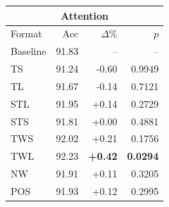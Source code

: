\begin{tabular}{lrrr}
\toprule
\multicolumn{4}{c}{\textbf{Attention }} \\
\midrule
Format & Acc & $\Delta$\% & $p$ \\
\midrule
Baseline & 91.83 & -- & -- \\
\midrule
TS & 91.24 & -0.60 & 0.9949 \\
TL & 91.67 & -0.14 & 0.7121 \\
STL & 91.95 & +0.14 & 0.2729 \\
STS & 91.81 & +0.00 & 0.4881 \\
TWS & 92.02 & +0.21 & 0.1756 \\
TWL & 92.23 & \textbf{+0.42} & \textbf{0.0294} \\
NW & 91.91 & +0.11 & 0.3205 \\
POS & 91.93 & +0.12 & 0.2995 \\
\bottomrule
\end{tabular}